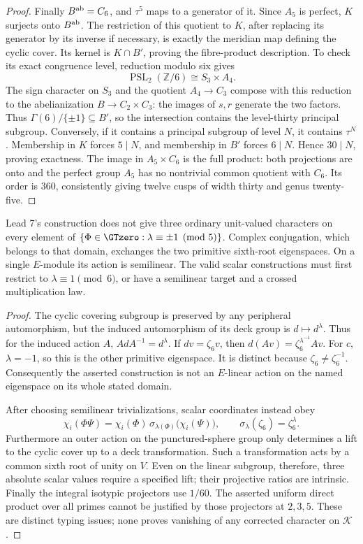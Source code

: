 \begin{proof}
Finally \(B^{\rm ab}=C_6\), and \(\tau^5\) maps to a
generator of it. Since \(A_5\) is perfect, \(K\) surjects
onto \(B^{\rm ab}\). The restriction of this quotient to
\(K\), after replacing its generator by its inverse if
necessary, is exactly the meridian map defining the cyclic
cover. Its kernel is \(K\cap B'\), proving the fibre-product
description. To check its exact congruence level, reduction
modulo six gives
\[
 \operatorname{PSL}_2(\mathbb Z/6)
       \cong S_3\times A_4.
\]
The sign character on \(S_3\) and the quotient
\(A_4\to C_3\) compose with this reduction to the
abelianization \(B\to C_2\times C_3\): the images of
\(s,r\) generate the two factors. Thus
\(\Gamma(6)/\{\pm1\}\subseteq B'\), so the
intersection contains the level-thirty principal subgroup.
Conversely, if it contains a principal subgroup of level
\(N\), it contains \(\tau^N\). Membership in \(K\)
forces \(5\mid N\), and membership in \(B'\) forces
\(6\mid N\). Hence \(30\mid N\), proving exactness.
The image in \(A_5\times C_6\) is the full product:
both projections are onto and the perfect group \(A_5\)
has no nontrivial common quotient with \(C_6\).
Its order is \(360\), consistently giving twelve cusps
of width thirty and genus twenty-five.
\end{proof}

Lead 7's construction does not give three ordinary unit-valued
characters on every element of
\(\{\Phi\in\GTzero:\lambda\equiv\pm1\pmod5\}\).
Complex conjugation, which belongs to that domain, exchanges
the two primitive sixth-root eigenspaces. On a single
\(E\)-module its action is semilinear. The valid scalar
constructions must first restrict to \(\lambda\equiv1\pmod6\),
or have a semilinear target and a crossed multiplication law.
\begin{proof}
The cyclic covering subgroup is preserved by any peripheral
automorphism, but the induced automorphism of its deck group
is \(d\mapsto d^\lambda\). Thus for the induced action \(A\),
\(AdA^{-1}=d^\lambda\). If \(dv=\zeta_6v\), then
\(d(Av)=\zeta_6^{\lambda^{-1}}Av\). For \(c\),
\(\lambda=-1\), so this is the other primitive eigenspace.
It is distinct because \(\zeta_6\ne\zeta_6^{-1}\).
Consequently the asserted construction is not an \(E\)-linear
action on the named eigenspace on its whole stated domain.

After choosing semilinear trivializations, scalar coordinates
instead obey
\[
 \chi_i(\Phi\Psi)=\chi_i(\Phi)\,
       \sigma_{\lambda(\Phi)}\bigl(\chi_i(\Psi)\bigr),
 \qquad \sigma_\lambda(\zeta_6)=\zeta_6^\lambda.
\]
Furthermore an outer action on the punctured-sphere group
only determines a lift to the cyclic cover up to a deck
transformation. Such a transformation acts by a common sixth
root of unity on \(V\). Even on the linear subgroup, therefore,
three absolute scalar values require a specified lift; their
projective ratios are intrinsic. Finally the integral isotypic
projectors use \(1/60\). The asserted uniform direct product
over all primes cannot be justified by those projectors at
\(2,3,5\). These are distinct typing issues; none proves
vanishing of any corrected character on \(\mathcal K\).
\end{proof}

